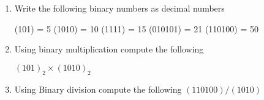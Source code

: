 

\begin{enumerate}
\item Write the following binary numbers as decimal numbers

(101)  = 5
(1010) = 10
(1111) = 15
(010101) = 21
(110100) = 50

\item Using binary multiplication compute the following

$(101)_2 \times (1010)_2$

\item Using Binary division compute the following $(110100) / (1010)$

\end{enumerate}
